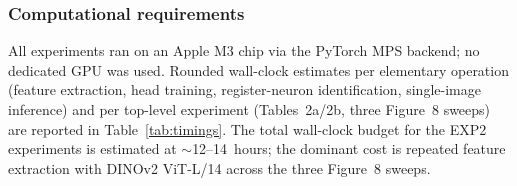 \subsubsection{Computational requirements}
All experiments ran on an Apple M3 chip via the PyTorch MPS backend; no dedicated GPU was used. Rounded wall-clock estimates per elementary operation (feature extraction, head training, register-neuron identification, single-image inference) and per top-level experiment (Tables~2a/2b, three Figure~8 sweeps) are reported in Table~\ref{tab:timings}. The total wall-clock budget for the EXP2 experiments is estimated at $\sim$12--14~hours; the dominant cost is repeated feature extraction with DINOv2 ViT-L/14 across the three Figure~8 sweeps.
